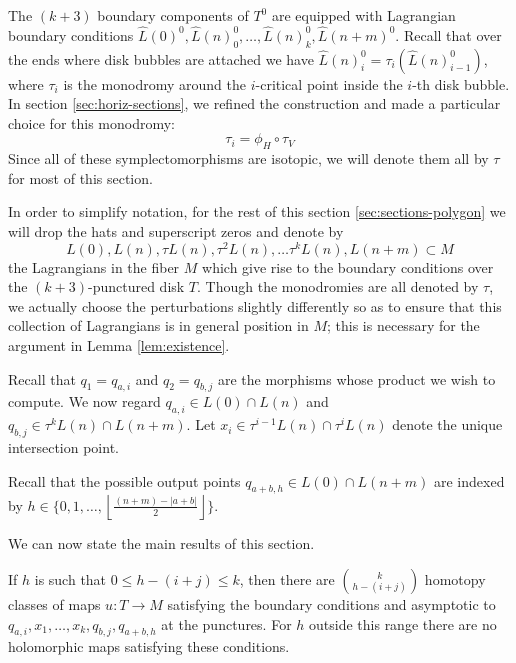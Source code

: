 \documentclass[12pt]{amsart}
\begin{document}
 The $(k+3)$ boundary components of $T^0$ are equipped
with Lagrangian boundary conditions $\hat{L}(0)^0, \hat{L}(n)^0_0,
\dots, \hat{L}(n)^0_k, \hat{L}(n+m)^0$. Recall that over the ends
where disk bubbles are attached we have $\hat{L}(n)^0_i = \tau_i(
\hat{L}(n)^0_{i-1})$, where $\tau_i$ is the monodromy around the
$i$-critical point inside the $i$-th disk bubble.
In section \ref{sec:horiz-sections}, we refined the construction and
made a particular choice for this monodromy:
\begin{equation}
  \label{eq:monodromies-equal}
  \tau_i = \phi_H \circ \tau_V
\end{equation}
Since all of these symplectomorphisms are isotopic, we will denote
them all by $\tau$ for most of this section.  

In order to simplify notation, for the rest of this section
\ref{sec:sections-polygon} we will drop the hats and superscript zeros
and denote by
\begin{equation}
  L(0),L(n),\tau L(n), \tau^2 L(n),\dots \tau^k L(n), L(n+m) \subset M
\end{equation}
the Lagrangians in the fiber $M$ which give rise to the boundary
conditions over the $(k+3)$-punctured disk $T$. Though the monodromies
are all denoted by $\tau$, we actually choose the perturbations
slightly differently so as to ensure that this collection of
Lagrangians is in general position in $M$; this is necessary for the
argument in Lemma \ref{lem:existence}.

Recall that $q_1 = q_{a,i}$ and $q_2 = q_{b,j}$ are the morphisms
whose product we wish to compute. We now regard $q_{a,i} \in L(0)\cap
L(n)$ and $q_{b,j}\in \tau^kL(n)\cap L(n+m)$. Let $x_i \in
\tau^{i-1}L(n) \cap \tau^i L(n)$ denote the unique intersection point.

Recall that the possible output points $q_{a+b,h} \in L(0)\cap L(n+m)$
are indexed by $h \in \{0,1,\dots,
\left\lfloor\frac{(n+m)-|a+b|}{2}\right\rfloor\}$.

We can now state the main results of this section.

\begin{proposition}
\label{prop:which-output}
If $h$ is such that $0 \leq h-(i+j) \leq k$, then there are
$\binom{k}{h-(i+j)}$ homotopy classes of maps $u:T\to M$ satisfying
the boundary conditions and asymptotic to
$q_{a,i},x_1,\dots,x_k,q_{b,j},q_{a+b,h}$ at the punctures. For $h$
outside this range there are no holomorphic maps satisfying these
conditions.
\end{proposition}
\end{document}
